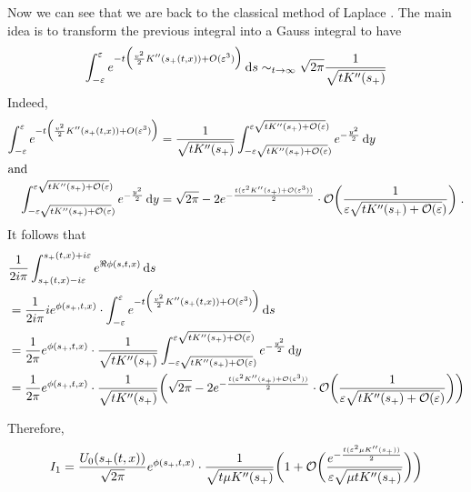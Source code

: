 Now we can see that we are back to the classical method of Laplace \cite{laplace1986memoir}. The main idea is to transform the previous integral into a Gauss integral to have
    \begin{equation}
    \int_{- \varepsilon}^{\varepsilon} e^{- t \Big(\frac{v^2}{2} K''(s_+(t,x)) + O(\varepsilon^3)\Big)} \, \mathrm ds 
    \sim_{t \to \infty}
    \sqrt{2\pi} \frac{1}{\sqrt{tK''(s_+)}}
    \end{equation}
Indeed, 
\begin{align*}
    \int_{- \varepsilon}^{\varepsilon} e^{- t \Big(\frac{v^2}{2} K''(s_+(t,x)) + O(\varepsilon^3)\Big)} 
    &= 
     \frac{1}{\sqrt{tK''(s_+)}} \int_{- \varepsilon \sqrt{tK''(s_+) + \mathcal{O}(\varepsilon})}^{\varepsilon \sqrt{tK''(s_+) + \mathcal{O}(\varepsilon})} e^{- \frac{y^2}{2}}\, \mathrm dy \\
     \intertext{and}
     \int_{- \varepsilon \sqrt{tK''(s_+) + \mathcal{O}(\varepsilon})}^{\varepsilon \sqrt{tK''(s_+) + \mathcal{O}(\varepsilon})} e^{- \frac{y^2}{2}}\, \mathrm dy &= 
    \sqrt{2\pi} - 2 e^{-\frac{t(\varepsilon^2 K''(s_+) + \mathcal{O}(\varepsilon^3))}{2}} \cdot \mathcal{O}\bigg(\frac{1 }{\varepsilon \sqrt{tK''(s_+) + \mathcal{O}(\varepsilon})}\bigg)
    \; .
\end{align*}
It follows that 
    \begin{align*}
     &\frac{1}{2i\pi}   \int_{s_+(t,x) - i\varepsilon}^{s_+(t,x) + i\varepsilon} e^{\Re \phi(s,t,x)} \, \mathrm ds \\
     &= 
     \frac{1}{2i\pi} i e^{\phi(s_+, t, x)} \cdot \int_{- \varepsilon}^{\varepsilon} e^{- t \Big(\frac{v^2}{2} K''(s_+(t,x)) + O(\varepsilon^3)\Big)} \, \mathrm ds  \\
     &= 
      \frac{1}{2\pi} e^{\phi(s_+, t, x)} \cdot \frac{1}{\sqrt{tK''(s_+)}} \int_{- \varepsilon \sqrt{tK''(s_+) + \mathcal{O}(\varepsilon})}^{\varepsilon \sqrt{tK''(s_+) + \mathcal{O}(\varepsilon})} e^{- \frac{y^2}{2}}\, \mathrm dy \\
     &=
    \frac{1}{2\pi} e^{\phi(s_+, t, x)} \cdot \frac{1}{\sqrt{tK''(s_+)}} \bigg( 
    \sqrt{2\pi} - 2 e^{-\frac{t(\varepsilon^2 K''(s_+) + \mathcal{O}(\varepsilon^3))}{2}} \cdot \mathcal{O}\bigg(\frac{1 }{\varepsilon \sqrt{tK''(s_+) + \mathcal{O}(\varepsilon})}\bigg) \bigg) \\
    \end{align*}
    
Therefore, 
    \begin{equation}
    I_1 = \frac{U_0(s_+(t,x))}{\sqrt{2\pi}} e^{\phi(s_+, t, x)} \cdot \frac{1}{\sqrt{t \mu K''(s_+)}} \bigg( 
    1 + \mathcal{O}\bigg(\frac{e^{-\frac{t(\varepsilon^2 \mu K''(s_+))}{2}} }{\varepsilon \sqrt{\mu tK''(s_+)}}\bigg) \bigg)\\
    \end{equation}

